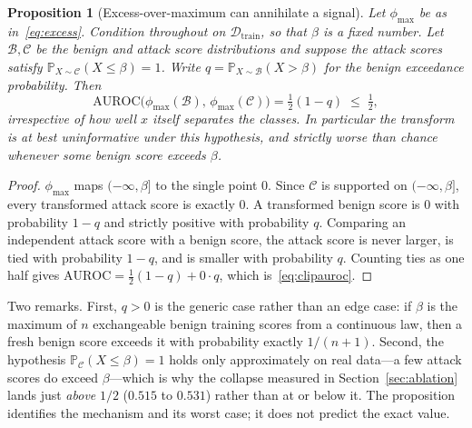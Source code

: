 \documentclass[preprint,12pt,number]{elsarticle}
\newtheorem{proposition}[theorem]{Proposition}
\theoremstyle{definition}
\newcommand{\Prob}{\mathbb{P}}
\newcommand{\Dcal}{\mathcal{D}}
\newcommand{\Ccal}{\mathcal{C}}
\newcommand{\Bcal}{\mathcal{B}}
\begin{document}
\begin{proposition}[Excess-over-maximum can annihilate a signal]\label{prop:clip}
Let $\phi_{\max}$ be as in~\eqref{eq:excess}. Condition throughout on
$\Dcal_{\mathrm{train}}$, so that $\beta$ is a fixed number. Let $\Bcal, \Ccal$ be
the benign and attack score distributions and suppose the attack scores satisfy
$\Prob_{X \sim \Ccal}(X \le \beta) = 1$. Write
$q = \Prob_{X \sim \Bcal}(X > \beta)$ for the benign exceedance probability. Then
\begin{equation}\label{eq:clipauroc}
\mathrm{AUROC}\big(\phi_{\max}(\Bcal),\, \phi_{\max}(\Ccal)\big)
= \tfrac{1}{2}(1 - q) \;\le\; \tfrac{1}{2},
\end{equation}
irrespective of how well $x$ itself separates the classes. In particular the
transform is at best uninformative under this hypothesis, and strictly
\emph{worse} than chance whenever some benign score exceeds $\beta$.
\end{proposition}

\begin{proof}
$\phi_{\max}$ maps $(-\infty, \beta]$ to the single point $0$. Since $\Ccal$ is
supported on $(-\infty,\beta]$, every transformed attack score is exactly $0$. A
transformed benign score is $0$ with probability $1-q$ and strictly positive with
probability $q$. Comparing an independent attack score with a benign score, the
attack score is never larger, is tied with probability $1-q$, and is smaller with
probability $q$. Counting ties as one half gives
$\mathrm{AUROC} = \tfrac{1}{2}(1-q) + 0 \cdot q$, which is~\eqref{eq:clipauroc}.
\end{proof}

Two remarks. First, $q>0$ is the generic case rather than an edge case: if $\beta$
is the maximum of $n$ exchangeable benign training scores from a continuous law,
then a fresh benign score exceeds it with probability exactly $1/(n+1)$. Second,
the hypothesis $\Prob_{\Ccal}(X \le \beta) = 1$ holds only approximately on real
data---a few attack scores do exceed $\beta$---which is why the collapse measured
in Section~\ref{sec:ablation} lands just \emph{above} $1/2$ ($0.515$ to $0.531$)
rather than at or below it. The proposition identifies the mechanism and its worst
case; it does not predict the exact value.
\end{document}
